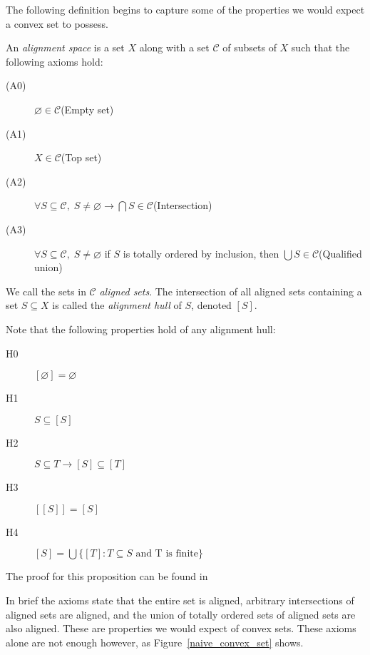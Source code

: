 \documentclass[11pt,a4paper]{llncs}
\newcounter{ax}
\begin{document}
The following definition begins to capture some of the properties we would expect a convex set to possess.

\begin{definition}
An \emph{alignment space} is a set $X$ along with a set $\mathcal{C}$ of subsets of $X$ such that the following axioms hold:

\begin{description}
 \item [(A0)] $\varnothing \in \mathcal{C}$\hfill (Empty set)\label{a0}
 \item [(A1)] $X \in \mathcal{C}$\hfill (Top set)\label{a1}
 \item [(A2)] $\forall S\subseteq \mathcal{C}, \; S\not= \varnothing \rightarrow \bigcap S \in\mathcal{C}$\hfill (Intersection)\label{a2}
 \item [(A3)] $\forall S\subseteq \mathcal{C}, \; S\not= \varnothing$ if $S$ is totally ordered by inclusion, then $\bigcup S\in\mathcal{C}$\hfill (Qualified union)\label{a3}
\end{description}

We call the sets in $\mathcal{C}$ \emph{aligned sets}. The intersection of all aligned sets containing a set $S\subseteq X$ is called the \emph{alignment hull} of $S$, denoted $[S]$.
\end{definition}
 
 \begin{proposition}
 Note that the following properties hold of any alignment hull:
 \begin{description}
 \item [H0] $[\varnothing]=\varnothing$
 \item [H1] $S\subseteq[S]$
 \item [H2] $S\subseteq T \rightarrow [S]\subseteq [T]$
 \item [H3] $[[S]]=[S]$
 \item [H4] $[S] = \bigcup \{[T]: T\subseteq S \text{ and T is finite}\}$
 \end{description}
 \end{proposition}
 
The proof for this proposition can be found in \cite{Coppel98}

In brief the axioms state that the entire set is aligned, arbitrary intersections of aligned sets are aligned, and the union of totally ordered sets of aligned sets are also aligned. These are properties we would expect of convex sets. These axioms alone are not enough however, as Figure~\ref{naive_convex_set} shows.
\end{document}
